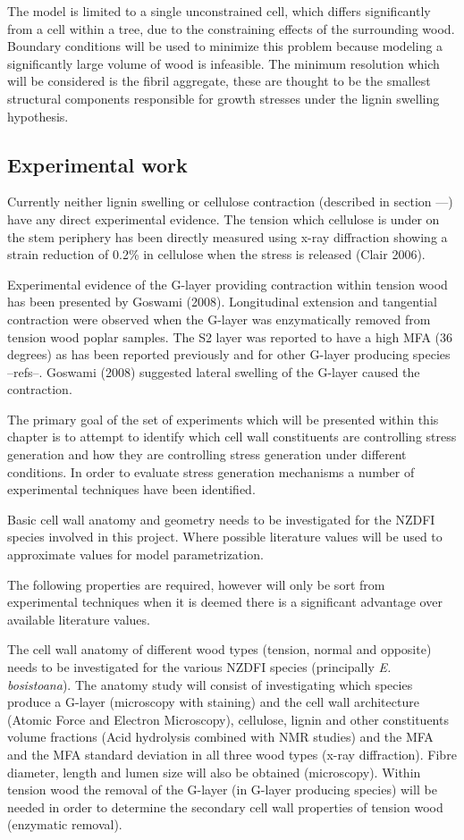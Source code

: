 \documentclass{article}
\begin{document}
The model is limited to a single unconstrained cell, which differs significantly
from a cell within a tree, due to the constraining effects of the surrounding
wood. Boundary conditions will be used to minimize this problem because modeling
a significantly large volume of wood is infeasible. The minimum resolution which
will be considered is the fibril aggregate, these are thought to be the smallest
structural components responsible for growth stresses under the lignin swelling
hypothesis.


\subsection{Experimental work}
Currently neither lignin swelling or cellulose contraction (described in section
---) have any direct experimental evidence. The tension which cellulose is under
on the stem periphery has been directly measured using x-ray diffraction showing
a strain reduction of 0.2\% in cellulose when the stress is released (Clair
2006).

Experimental evidence of the G-layer providing contraction within tension wood
has been presented by Goswami (2008). Longitudinal extension and tangential
contraction were observed when the G-layer was enzymatically removed from
tension wood poplar samples. The S2 layer was reported to have a high MFA (36
degrees) as has been reported previously and for other G-layer producing species
--refs--. Goswami (2008) suggested lateral swelling of the G-layer caused the
contraction.

The primary goal of the set of experiments which will be presented within this
chapter is to attempt to identify which cell wall constituents are controlling
stress generation and how they are controlling stress generation under different
conditions. In order to evaluate stress generation mechanisms a number of
experimental techniques have been identified.

Basic cell wall anatomy and geometry needs to be investigated for the NZDFI
species involved in this project. Where possible literature values will be used
to approximate values for model parametrization.

The following properties are required, however will only be sort from
experimental techniques when it is deemed there is a significant advantage over
available literature values.

The cell wall anatomy of different wood types (tension, normal and opposite)
needs to be investigated for the various NZDFI species (principally \textit{E.
bosistoana}). The anatomy study will consist of investigating which species
produce a G-layer (microscopy with staining) and the cell wall architecture
(Atomic Force and Electron Microscopy), cellulose, lignin and other constituents
volume fractions (Acid hydrolysis combined with NMR studies)  and the MFA and
the MFA standard deviation in all three wood types (x-ray diffraction). Fibre
diameter, length and lumen size will also be obtained (microscopy). Within
tension wood the removal of the G-layer (in G-layer producing species) will be
needed in order to determine the secondary cell wall properties of tension wood
(enzymatic removal).
\end{document}
